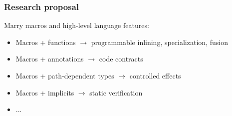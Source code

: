 \documentclass[hyperref={bookmarks=false}]{beamer}
\begin{document}
\begin{frame}[fragile]
\frametitle{Research proposal}

Marry macros and high-level language features:

\begin{itemize}
\item Macros + functions $\rightarrow$ programmable inlining, specialization, fusion
\item Macros + annotations $\rightarrow$ code contracts
\item Macros + path-dependent types $\rightarrow$ controlled effects
\item Macros + implicits $\rightarrow$ static verification
\item ...
\end{itemize}
\end{frame}
\end{document}
